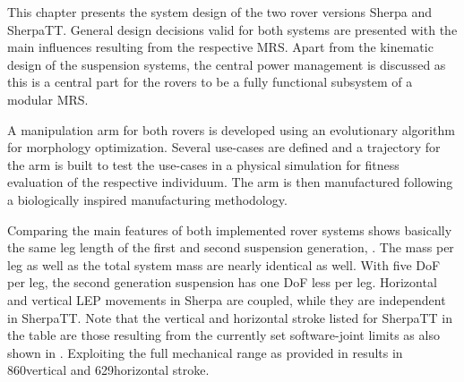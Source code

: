 This chapter presents the \electromech system design of the two rover versions Sherpa and SherpaTT.
General design decisions valid for both systems are presented with the main influences resulting from the respective \ac{MRS}.
Apart from the kinematic design of the suspension systems, the central power management is discussed as this is a central part for the rovers to be a fully functional subsystem of a modular \ac{MRS}.

A manipulation arm for both rovers is developed using an evolutionary algorithm for morphology optimization.
Several use-cases are defined and a trajectory for the arm is built to test the use-cases in a physical simulation for fitness evaluation of the respective individuum.
The arm is then manufactured following a biologically inspired manufacturing methodology.

Comparing the main features of both implemented rover systems shows basically the same leg length of the first and second suspension generation, .
The mass per leg as well as the total system mass are nearly identical as well.
With five \ac{DoF} per leg, the second generation suspension has one \ac{DoF} less per leg.
Horizontal and vertical \ac{LEP} movements in Sherpa are coupled, while they are independent in SherpaTT.
Note that the vertical and horizontal stroke listed for SherpaTT in the table are those resulting from the currently set software-joint limits as also shown in .
Exploiting the full mechanical range as provided in  results in 860\unitmm vertical and 629\unitmm horizontal stroke.

